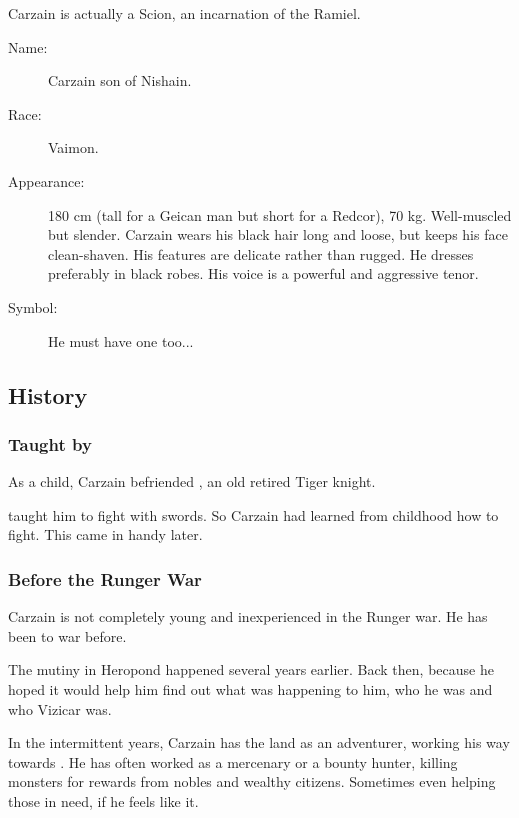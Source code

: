 Carzain is actually a Scion, an incarnation of the \Malach{} Ramiel. 

\begin{description}
  \item[Name:] {Carzain} son of {Nishain}. 
  \item[Race:] Vaimon. 
  \item[Appearance:] 
    180 cm (tall for a Geican man but short for a Redcor), 70 kg. Well-muscled but slender. Carzain wears his black hair long and loose, but keeps his face clean-shaven. His features are delicate rather than rugged. He dresses preferably in black robes. His voice is a powerful and aggressive tenor. 
  \item[Symbol:] He must have one too... 
\end{description}









\subsection{History}





\subsubsection[Taught by Weylon]{Taught by {\Weylon}}
As a child, Carzain befriended , an old retired Tiger knight. 

\Weylon{} taught him to fight with swords. 
So Carzain had learned from childhood how to fight. 
This came in handy later. 





\subsubsection{Before the Runger War}
Carzain is not completely young and inexperienced in the Runger war. 
He has been to war before. 

The mutiny in Heropond happened several years earlier. 
Back then,  because he hoped it would help him find out what was happening to him, who he was and who Vizicar was. 

In the intermittent years, Carzain has \travelled the land as an adventurer, working his way towards \kenosis. 
He has often worked as a mercenary or a bounty hunter, killing monsters for rewards from nobles and wealthy citizens. 
Sometimes even helping those in need, if he feels like it. 

